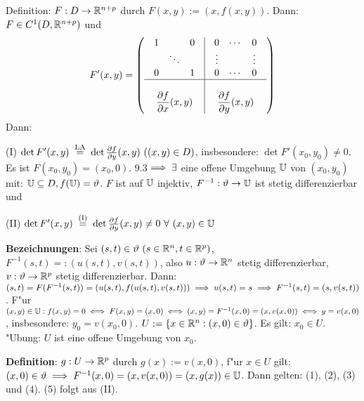 \documentclass[a4paper,twoside,DIV15,BCOR12mm,chapterprefix=true,headings=twolinechapter]{scrbook}
\begin{document}
\begin{beweis}
Definition: $F:D\to\mathbb{R}^{n+p}$ durch $F(x,y):=(x,f(x,y))$. Dann: $F\in C^1(D,\mathbb{R}^{n+p})$ und
$$
F'(x,y)=\left(\begin{array}{c|c}
\begin{array}{ccc}
1  &        & 0 \\
   & \ddots &   \\
0  &        & 1 \\
\end{array} & 
\begin{array}{ccc}
0  & \cdots & 0 \\
\vdots   &  & \vdots  \\
0  & \cdots & 0 \\
\end{array} \\
\hline\\
\displaystyle\frac{\partial f}{\partial x}(x,y)&
\displaystyle\frac{\partial f}{\partial y}(x,y)
\end{array}
\right)$$
Dann: \begin{liste}
\item[(I)] $\det F'(x,y)\gleichnach{LA}\det\frac{\partial f}{\partial y}(x,y)\ ((x, y) \in D)$, insbesondere: $\det F'(x_0, y_0)\ne 0$. Es ist $F(x_0, y_0)=(x_0, 0)$. 9.3$\implies\exists$ eine offene Umgebung $\mathbb{U}$ von $(x_0, y_0)$ mit: $\mathbb{U}\subseteq D, f(\mathbb{U})=\vartheta$. $F$ ist auf $\mathbb{U}$ injektiv, $F^{-1}:\vartheta\to\mathbb{U}$ ist stetig differenzierbar und
\item[(II)] $\det F'(x,y)\gleichnach{(I)}\det\frac{\partial f}{\partial y}(x,y)\ne 0\ \forall\ (x,y)\in\MdU$
\end{liste}
\textbf{Bezeichnungen}: Sei $(s,t)\in\vartheta\ (s\in\mathbb{R}^n, t\in\mathbb{R}^p)$, $F^{-1}(s,t)=:(u(s,t),v(s,t))$, also $u:\vartheta\to\mathbb{R}^n$ stetig differenzierbar, $v:\vartheta\to\mathbb{R}^p$ stetig differenzierbar. Dann: $(s,t)=F(F^{-1}(s,t))=(u(s,t),f(u(s,t),v(s,t)))\implies u(s,t)=s\implies F^{-1}(s,t)=(s,v(s,t))$. F"ur $(x,y)\in\mathbb{U}: f(x,y)=0\iff F(x,y)=(x,0)\iff(x,y)=F^{-1}(x,0)=(x,v(x,0))\iff y=v(x,0)$, insbesondere: $y_0=v(x_0,0)$. $U:=\{x\in\mathbb{R}^n: (x,0)\in\vartheta\}$. Es gilt: $x_0\in U$. "Ubung: $U$ ist eine offene Umgebung von $x_0$.

\textbf{Definition}: $g:U\to\mathbb{R}^p$ durch $g(x):=v(x,0)$, f"ur $x\in U$ gilt: $(x,0)\in\vartheta\implies F^{-1}(x,0)=(x,v(x,0))=(x,g(x))\in \mathbb{U}$. Dann gelten: (1), (2), (3) und (4). (5) folgt aus (II).


\end{beweis}
\end{document}
